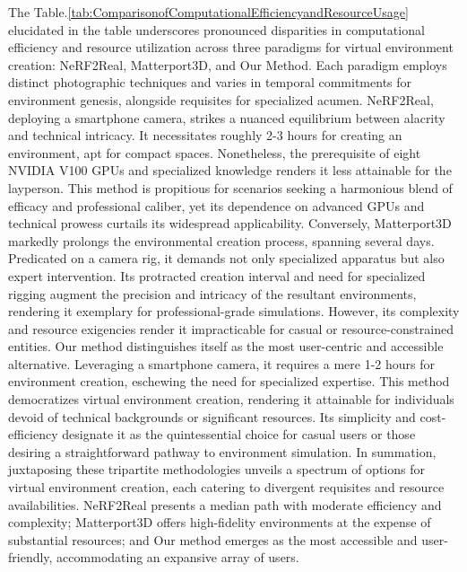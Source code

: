 \singlespacing
The Table.\ref{tab:ComparisonofComputationalEfficiencyandResourceUsage} elucidated in the table underscores pronounced disparities in computational efficiency and resource utilization across three paradigms for virtual environment creation: NeRF2Real, Matterport3D, and Our Method. Each paradigm employs distinct photographic techniques and varies in temporal commitments for environment genesis, alongside requisites for specialized acumen. 
\singlespacing
NeRF2Real, deploying a smartphone camera, strikes a nuanced equilibrium between alacrity and technical intricacy. It necessitates roughly 2-3 hours for creating an environment, apt for compact spaces. Nonetheless, the prerequisite of eight NVIDIA V100 GPUs and specialized knowledge renders it less attainable for the layperson. This method is propitious for scenarios seeking a harmonious blend of efficacy and professional caliber, yet its dependence on advanced GPUs and technical prowess curtails its widespread applicability.
\singlespacing
Conversely, Matterport3D markedly prolongs the environmental creation process, spanning several days. Predicated on a camera rig, it demands not only specialized apparatus but also expert intervention. Its protracted creation interval and need for specialized rigging augment the precision and intricacy of the resultant environments, rendering it exemplary for professional-grade simulations. However, its complexity and resource exigencies render it impracticable for casual or resource-constrained entities.
\singlespacing
Our method distinguishes itself as the most user-centric and accessible alternative. Leveraging a smartphone camera, it requires a mere 1-2 hours for environment creation, eschewing the need for specialized expertise. This method democratizes virtual environment creation, rendering it attainable for individuals devoid of technical backgrounds or significant resources. Its simplicity and cost-efficiency designate it as the quintessential choice for casual users or those desiring a straightforward pathway to environment simulation.
\singlespacing
In summation, juxtaposing these tripartite methodologies unveils a spectrum of options for virtual environment creation, each catering to divergent requisites and resource availabilities. NeRF2Real presents a median path with moderate efficiency and complexity; Matterport3D offers high-fidelity environments at the expense of substantial resources; and Our method emerges as the most accessible and user-friendly, accommodating an expansive array of users.



